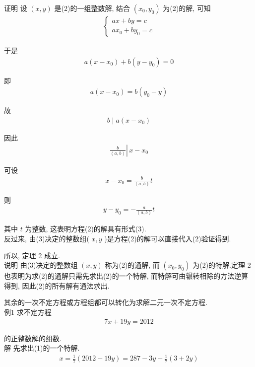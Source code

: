 	证明 设 $(x, y)$ 是(2)的一组整数解, 结合 $\left(x_{0}, y_{0}\right)$ 为(2)的解, 可知
\begin{align*}
		\left\{\begin{array}{l}
			       a x+b y=c \\
			       a x_{0}+b y_{0}=c
		       \end{array}\right.
	\end{align*}

	于是
\begin{align*}
		a\left(x-x_{0}\right)+b\left(y-y_{0}\right)=0
	\end{align*}

	即
\begin{align*}
		a\left(x-x_{0}\right)=b\left(y_{0}-y\right)
	\end{align*}

	故
\begin{align*}
		b \mid a\left(x-x_{0}\right)
	\end{align*}

	因此
\begin{align*}
		\left.\frac{b}{(a, b)} \right\rvert\, x-x_{0}
	\end{align*}

	可设
\begin{align*}
		x-x_{0}=\frac{b}{(a, b)} t
	\end{align*}

	则
\begin{align*}
		y-y_{0}=-\frac{a}{(a, b)} t
	\end{align*}

	其中 $t$ 为整数, 这表明方程(2)的解具有形式(3).\\
	反过来, 由(3)决定的整数组( $x, y$ )是方程(2)的解可以直接代入(2)验证得到.

	所以, 定理 2 成立. \\
	说明 由(3)决定的整数组 $(x, y)$ 称为(2)的通解, 而 $\left(x_{0}, y_{0}\right)$ 为(2)的特解.定理 2 也表明为求(2)的通解只需先求出(2)的一个特解, 而特解可由辗转相除的方法逆算得到, 因此(2)的所有解有通法求出.

	其余的一次不定方程或方程组都可以转化为求解二元一次不定方程. \\
	例1 求不定方程
\begin{align*}
		7 x+19 y=2012
	\end{align*}

	的正整数解的组数.\\
	解 先求出(1)的一个特解.
\begin{align*}
		x=\frac{1}{7}(2012-19 y)=287-3 y+\frac{1}{7}(3+2 y)
	\end{align*}

